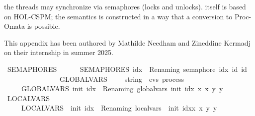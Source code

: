 \begin{isabellebody}
\begin{isamarkuptext}
the threads may synchronize via semaphores (locks and unlocks).  itself is based on 
HOL-CSPM; the semantics is constructed in a way that a conversion to Proc-Omata is possible.%
\end{isamarkuptext}\isamarkuptrue%
%
\begin{isamarkuptext}%
This appendix has been authored by Mathilde Needham and Zineddine Kermadj on their 
internship in summer 2025.%
\end{isamarkuptext}\isamarkuptrue%
%
\isadelimdocument
%
\endisadelimdocument
%
\isatagdocument
%
\isamarkuptrue%
%
\endisatagdocument
{\isafolddocument}%
%
\isadelimdocument
%
\endisadelimdocument
{}\isamarkupfalse%
\ SEMAPHORES\ \isanewline
\ \ \ \ \ {\isacartoucheopen}SEMAPHORES\ idx\ {\isasymequiv}\ Renaming\ {\isacharparenleft}{\kern0pt}semaphore\ idx{\isacharparenright}{\kern0pt}\ id\ id{\isacartoucheclose}\isanewline
\ \ \ \ \ \ \ \ \ %
\ \ \ \isanewline
\ \isanewline
{}\isamarkupfalse%
\ GLOBALVARS\ {\isacharcolon}{\kern0pt}{\isacharcolon}{\kern0pt}\ \ {\isachardoublequoteopen}{\isasymsigma}\ {\isasymRightarrow}\ string\ {\isasymRightarrow}\ evs\ process{\isachardoublequoteclose}\isanewline
\ \ \ \ \ {\isacartoucheopen}GLOBALVARS\ {\isasymsigma}\isactrlsub i\isactrlsub n\isactrlsub i\isactrlsub t\ idx\ {\isasymequiv}\ Renaming\ {\isacharparenleft}{\kern0pt}global{\isacharunderscore}{\kern0pt}vars\ {\isasymsigma}\isactrlsub i\isactrlsub n\isactrlsub i\isactrlsub t\ idx{\isacharparenright}{\kern0pt}\ {\isacharparenleft}{\kern0pt}{\isasymlambda}x{\isachardot}{\kern0pt}\ x{\isacharparenright}{\kern0pt}\ {\isacharparenleft}{\kern0pt}{\isasymlambda}y{\isachardot}{\kern0pt}\ y{\isacharparenright}{\kern0pt}{\isacartoucheclose}\isanewline
\isanewline
{}\isamarkupfalse%
\ LOCALVARS\ \isanewline
\ \ \ \ \ {\isacartoucheopen}LOCALVARS\ \ {\isasymsigma}\isactrlsub i\isactrlsub n\isactrlsub i\isactrlsub t\ idx\ {\isasymequiv}\ Renaming\ {\isacharparenleft}{\kern0pt}local{\isacharunderscore}{\kern0pt}vars\ \ {\isasymsigma}\isactrlsub i\isactrlsub n\isactrlsub i\isactrlsub t\ idx{\isacharparenright}{\kern0pt}{\isacharparenleft}{\kern0pt}{\isasymlambda}x{\isachardot}{\kern0pt}\ x{\isacharparenright}{\kern0pt}\ {\isacharparenleft}{\kern0pt}{\isasymlambda}y{\isachardot}{\kern0pt}\ y{\isacharparenright}{\kern0pt}{\isacartoucheclose}%

\end{isabellebody}
